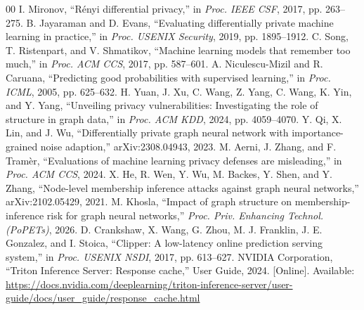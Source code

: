 \documentclass[conference]{IEEEtran}
\begin{document}
\begin{thebibliography}{00}
 I. Mironov, ``R\'enyi differential privacy,'' in \emph{Proc. IEEE CSF}, 2017, pp. 263--275.
 B. Jayaraman and D. Evans, ``Evaluating differentially private machine learning in practice,'' in \emph{Proc. USENIX Security}, 2019, pp. 1895--1912.
 C. Song, T. Ristenpart, and V. Shmatikov, ``Machine learning models that remember too much,'' in \emph{Proc. ACM CCS}, 2017, pp. 587--601.
 A. Niculescu-Mizil and R. Caruana, ``Predicting good probabilities with supervised learning,'' in \emph{Proc. ICML}, 2005, pp. 625--632.
 H. Yuan, J. Xu, C. Wang, Z. Yang, C. Wang, K. Yin, and Y. Yang, ``Unveiling privacy vulnerabilities: Investigating the role of structure in graph data,'' in \emph{Proc. ACM KDD}, 2024, pp. 4059--4070.
 Y. Qi, X. Lin, and J. Wu, ``Differentially private graph neural network with importance-grained noise adaption,'' arXiv:2308.04943, 2023.
 M. Aerni, J. Zhang, and F. Tram\`er, ``Evaluations of machine learning privacy defenses are misleading,'' in \emph{Proc. ACM CCS}, 2024.
 X. He, R. Wen, Y. Wu, M. Backes, Y. Shen, and Y. Zhang, ``Node-level membership inference attacks against graph neural networks,'' arXiv:2102.05429, 2021.
 M. Khosla, ``Impact of graph structure on membership-inference risk for graph neural networks,'' \emph{Proc. Priv. Enhancing Technol. (PoPETs)}, 2026.
 D. Crankshaw, X. Wang, G. Zhou, M. J. Franklin, J. E. Gonzalez, and I. Stoica, ``Clipper: A low-latency online prediction serving system,'' in \emph{Proc. USENIX NSDI}, 2017, pp. 613--627.
 NVIDIA Corporation, ``Triton Inference Server: Response cache,'' User Guide, 2024. [Online]. Available: \url{https://docs.nvidia.com/deeplearning/triton-inference-server/user-guide/docs/user_guide/response_cache.html}
\end{thebibliography}
\end{document}
